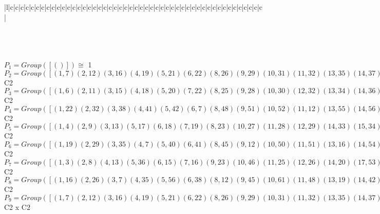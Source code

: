 \documentclass[varwidth=\maxdimen,border=10]{standalone}
\begin{document}
\begin{tabular}
\begin{array}{|l|c|c|c|c|c|c|c|c|c|c|c|c|c|c|c|c|c|c|c|c|c|c|c|c|c|c|c|c|c|c|c|c|c|c|c|c|c|c|c|c|c|c|c|c|c|c|c|c|c|}
\end{array}\)\\
\ \\
\ \\
$P_{1} = Group( [ () ] )\cong$ 1\ \\
$P_{2} = Group( [ ( 1, 7)( 2,12)( 3,16)( 4,19)( 5,21)( 6,22)( 8,26)( 9,29)(10,31)(11,32)(13,35)(14,37)(15,38)(17,40)(18,41)(20,42)(23,45)(24,47)(25,48)(27,50)(28,51)(30,52)(33,54)(34,55)(36,56)(39,57)(43,59)(44,60)(46,61)(49,62)(53,63)(58,64) ] )\cong$ C2\ \\
$P_{3} = Group( [ ( 1, 6)( 2,11)( 3,15)( 4,18)( 5,20)( 7,22)( 8,25)( 9,28)(10,30)(12,32)(13,34)(14,36)(16,38)(17,39)(19,41)(21,42)(23,44)(24,46)(26,48)(27,49)(29,51)(31,52)(33,53)(35,55)(37,56)(40,57)(43,58)(45,60)(47,61)(50,62)(54,63)(59,64) ] )\cong$ C2\ \\
$P_{4} = Group( [ ( 1,22)( 2,32)( 3,38)( 4,41)( 5,42)( 6, 7)( 8,48)( 9,51)(10,52)(11,12)(13,55)(14,56)(15,16)(17,57)(18,19)(20,21)(23,60)(24,61)(25,26)(27,62)(28,29)(30,31)(33,63)(34,35)(36,37)(39,40)(43,64)(44,45)(46,47)(49,50)(53,54)(58,59) ] )\cong$ C2\ \\
$P_{5} = Group( [ ( 1, 4)( 2, 9)( 3,13)( 5,17)( 6,18)( 7,19)( 8,23)(10,27)(11,28)(12,29)(14,33)(15,34)(16,35)(20,39)(21,40)(22,41)(24,43)(25,44)(26,45)(30,49)(31,50)(32,51)(36,53)(37,54)(38,55)(42,57)(46,58)(47,59)(48,60)(52,62)(56,63)(61,64) ] )\cong$ C2\ \\
$P_{6} = Group( [ ( 1,19)( 2,29)( 3,35)( 4, 7)( 5,40)( 6,41)( 8,45)( 9,12)(10,50)(11,51)(13,16)(14,54)(15,55)(17,21)(18,22)(20,57)(23,26)(24,59)(25,60)(27,31)(28,32)(30,62)(33,37)(34,38)(36,63)(39,42)(43,47)(44,48)(46,64)(49,52)(53,56)(58,61) ] )\cong$ C2\ \\
$P_{7} = Group( [ ( 1, 3)( 2, 8)( 4,13)( 5,36)( 6,15)( 7,16)( 9,23)(10,46)(11,25)(12,26)(14,20)(17,53)(18,34)(19,35)(21,56)(22,38)(24,30)(27,58)(28,44)(29,45)(31,61)(32,48)(33,39)(37,42)(40,63)(41,55)(43,49)(47,52)(50,64)(51,60)(54,57)(59,62) ] )\cong$ C2\ \\
$P_{8} = Group( [ ( 1,16)( 2,26)( 3, 7)( 4,35)( 5,56)( 6,38)( 8,12)( 9,45)(10,61)(11,48)(13,19)(14,42)(15,22)(17,63)(18,55)(20,37)(21,36)(23,29)(24,52)(25,32)(27,64)(28,60)(30,47)(31,46)(33,57)(34,41)(39,54)(40,53)(43,62)(44,51)(49,59)(50,58) ] )\cong$ C2\ \\
$P_{9} = Group( [ ( 1, 7)( 2,12)( 3,16)( 4,19)( 5,21)( 6,22)( 8,26)( 9,29)(10,31)(11,32)(13,35)(14,37)(15,38)(17,40)(18,41)(20,42)(23,45)(24,47)(25,48)(27,50)(28,51)(30,52)(33,54)(34,55)(36,56)(39,57)(43,59)(44,60)(46,61)(49,62)(53,63)(58,64), ( 1, 6)( 2,11)( 3,15)( 4,18)( 5,20)( 7,22)( 8,25)( 9,28)(10,30)(12,32)(13,34)(14,36)(16,38)(17,39)(19,41)(21,42)(23,44)(24,46)(26,48)(27,49)(29,51)(31,52)(33,53)(35,55)(37,56)(40,57)(43,58)(45,60)(47,61)(50,62)(54,63)(59,64) ] )\cong$ C2 x C2\ \\

\end{tabular}
\end{document}
